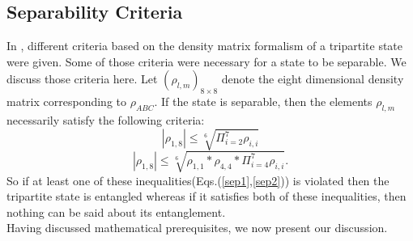 \documentclass[pra,10pt,twocolumn,superscriptaddress,floatfix,showpacs]{revtex4-1}
\begin{document}
\subsection{Separability Criteria}
In \cite{guhne}, different criteria based on the density matrix formalism of  a tripartite state were given. Some of those criteria were necessary for a state to be separable. We discuss those criteria here.
 Let $(\rho_{l,m})_{8\times8}$ denote the eight dimensional density matrix corresponding to $\rho_{ABC}$. If the state is separable, then the elements $\rho_{l,m}$ necessarily satisfy the following criteria:
\begin{equation}\label{sep1}
    |\rho_{1,8}|\leq \sqrt[6]{\Pi_{i=2}^7\rho_{i,i}}
\end{equation}
\begin{equation}\label{sep2}
    |\rho_{1,8}|\leq \sqrt[6]{\rho_{1,1}*\rho_{4,4}*\Pi_{i=4}^7\rho_{i,i}}.
\end{equation}
So if at least one of these inequalities(Eqs.(\ref{sep1},\ref{sep2})) is violated then the tripartite state is entangled whereas if it satisfies both of these inequalities, then nothing can be said about its entanglement. \\
Having discussed mathematical prerequisites, we now present our discussion.
\end{document}
